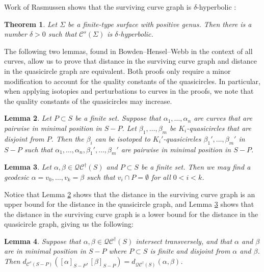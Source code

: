 \documentclass[12pt,a4paper]{amsart}
\theoremstyle{definition}
\theoremstyle{plain}
\newtheorem{theorem}{Theorem}[section]
\newtheorem{lemma}[theorem]{Lemma}
\numberwithin{equation}{section}
\newcommand{\qcg}{\mathcal{QC}^{\dagger}}
\begin{document}
Work of Rasmussen shows that the surviving curve graph is $\delta$-hyperbolic \cite{rasmussen}:

\begin{theorem}\label{Thm:SurvivingHyperbolic}
    Let $\Sigma$ be a finite-type surface with positive genus. Then
    there is a number $\delta > 0$ such that $\mathcal{C}^s(\Sigma)$ is $\delta$-hyperbolic.
\end{theorem}


The following two lemmas, found in Bowden--Hensel--Webb \cite[Lemmas 3.5 \& 3.6]{bowden2022quasimorphisms} in the context of all curves, allow us to prove that  distance in the surviving curve graph and  distance in the quasicircle graph are equivalent.
Both proofs only require a minor modification to account for the quality constants of the quasicircles.
In particular, when applying isotopies and perturbations to curves in the proofs, we note that the quality constants of the quasicircles may increase.


\begin{lemma}\label{Lem:IsotopeToMinimalPosition}
    Let $P \subset S$ be a finite set.
    Suppose that $\alpha_1, \ldots, \alpha_n$ are curves that are pairwise in minimal position in $S - P$. Let $\beta_1, \ldots , \beta_m$ be $K_i$-quasicircles that are disjoint from $P$.
    Then the $\beta_i$ can be isotoped to $K_i'$-quasicircles $\beta_1', \ldots , \beta_m'$ in $S - P$ such that $\alpha_1, \ldots , \alpha_n, \beta_1', \ldots , \beta_m'$ are
    pairwise in minimal position in $S - P$.
\end{lemma}

\begin{lemma}\label{Lem:GeodesicDisjointFromP}
    Let $\alpha, \beta \in \qcg(S)$ and $P \subset S$ be a finite set. Then we may find
a geodesic $\alpha = v_0, \ldots , v_k = \beta$ such that $v_i \cap P = \emptyset$ for all $0 < i < k$.
\end{lemma}


Notice that Lemma \ref{Lem:IsotopeToMinimalPosition} shows that the distance in the surviving curve graph is an upper bound for the distance in the quasicircle graph, and Lemma \ref{Lem:GeodesicDisjointFromP} shows that the distance in the surviving curve graph is a lower bound for the distance in the quasicircle graph, giving us the following: 

\begin{lemma}\label{Lem:DistanceinQCSurviving}
    Suppose that $\alpha, \beta \in \qcg(S)$ intersect transversely, and that $\alpha$ and $\beta$
    are in minimal position in $S -P$ where $P \subset S$ is finite and disjoint from $\alpha$
    and $\beta$. Then
    $d_{\mathcal{C}^s(S-P)}
    ([\alpha]_{S-P} , [\beta]_{S-P} ) = d_{\qcg(S)}
    (\alpha, \beta)$.
\end{lemma}
\end{document}
